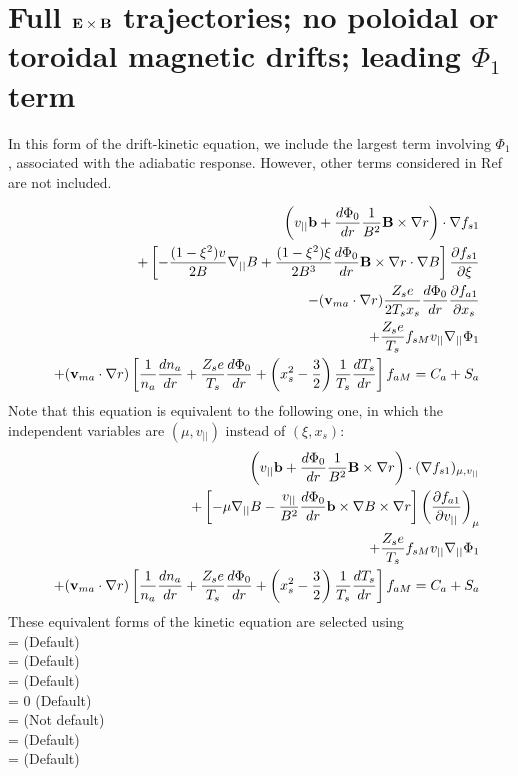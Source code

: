 \section{Full ${\mathbf E}\times{\mathbf B}$ trajectories; no poloidal or toroidal magnetic drifts; leading $\Phi_1$ term}

In this form of the drift-kinetic equation, we include the largest term involving $\Phi_1$,
associated with the adiabatic response.
However, other terms considered in Ref \cite{Regana2017} are not included.

\begin{eqnarray}
&&\left(v_{||}{\mathbf b} + \frac{d\Phi_0}{dr} \frac{1}{B^2} {\mathbf B}\times\nabla r \right) \cdot \nabla f_{s1} \\
&&+ \left[ - \frac{(1-\xi^2)v}{2B} \nabla_{||} B
+\frac{(1-\xi^2)\xi}{2B^3} \frac{d\Phi_0}{dr}{\mathbf B}\times\nabla r\cdot\nabla B \right]
 \frac{\partial f_{s1}}{\partial \xi} \nonumber \\
&&-({\mathbf v}_{ma} \cdot\nabla r) \frac{Z_s e}{2 T_s x_s} \frac{d\Phi_0}{dr} \frac{\partial f_{a1}}{\partial x_s} \nonumber \\
&&+\frac{Z_s e}{T_s} f_{sM} v_{||} \nabla_{||} \Phi_1 \nonumber \\
&&+ ({\mathbf v}_{ma} \cdot \nabla r) \left[ \frac{1}{n_a} \frac{dn_a}{dr} + \frac{Z_s e}{T_s} \frac{d\Phi_0}{dr} + \left(x_s^2-\frac{3}{2}\right) \frac{1}{T_s} \frac{dT_s}{dr}\right] f_{aM}
 = C_a + S_a \nonumber
\end{eqnarray}
Note that this equation is equivalent to the following one, in which the independent variables
are $(\mu,v_{||})$ instead of $(\xi,x_s)$:
\begin{eqnarray}
&&\left(v_{||}{\mathbf b} + \frac{d\Phi_0}{dr} \frac{1}{B^2} {\mathbf B}\times\nabla r \right) \cdot (\nabla f_{s1})_{\mu, v_{||}} \\
&&+ \left[ - \mu \nabla_{||} B
-\frac{v_{||}}{B^2} \frac{d\Phi_0}{dr} {\mathbf b}\times\nabla B \times \nabla r \right]
\left( \frac{\partial f_{a1}}{\partial v_{||}} \right)_{\mu} \nonumber \\
&&+\frac{Z_s e}{T_s} f_{sM} v_{||} \nabla_{||} \Phi_1 \nonumber \\
&& + ({\mathbf v}_{ma} \cdot \nabla r) \left[ \frac{1}{n_a} \frac{dn_a}{dr} + \frac{Z_s e}{T_s} \frac{d\Phi_0}{dr} + \left(x_s^2-\frac{3}{2}\right) \frac{1}{T_s} \frac{dT_s}{dr}\right] f_{aM}
=C_a + S_a \nonumber
\end{eqnarray}
These equivalent forms of the kinetic equation are selected using \\
 = \true  \;\;\; (Default) \\
 = \true \;\;\; (Default) \\
 = \false \;\;\; (Default) \\
 = 0 \;\;\; (Default) \\
 = \true \;\;\; (Not default) \\
 = \false \;\;\; (Default) \\
 = \false \;\;\; (Default)



